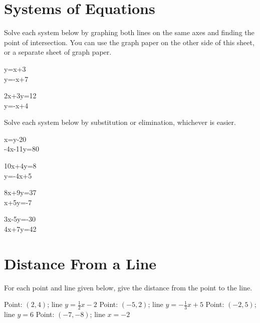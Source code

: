 \section*{Systems of Equations}
Solve each system below by graphing both lines on the same axes and finding the point of intersection. You can use the graph paper on the other side of this sheet, or a separate sheet of graph paper.
\begin{smenum}
\maitemxx
{\displaystyle\begin{System}
y=x+3\\
y=-x+7
\end{System}}
{\displaystyle\begin{System}
2x+3y=12\\
y=-x+4
\end{System}}
\end{smenum}
Solve each system below by substitution or elimination, whichever is easier.
\begin{smenum}
\maitemxx
{\displaystyle\begin{System}
x=y-20\\
-4x-11y=80
\end{System}}
{\displaystyle\begin{System}
10x+4y=8\\
y=-4x+5
\end{System}}
\maitemxx
{\displaystyle\begin{System}
8x+9y=37\\
x+5y=-7
\end{System}}
{\displaystyle\begin{System}
3x-5y=-30\\
4x+7y=42
\end{System}}
\end{smenum}

\section*{Distance From a Line}
For each point and line given below, give the distance from the point to the line.
\begin{smenum}
\mitemxx
{Point: $(2,4)$; line $y=\frac{1}{2}x-2$}
{Point: $(-5,2)$; line $y=-\frac{1}{3}x+5$}
\mitemxx
{Point: $(-2,5)$; line $y=6$}
{Point: $(-7,-8)$; line $x=-2$}
\end{smenum}
\graphpage
